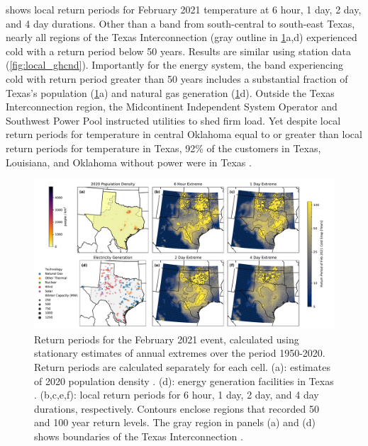 \documentclass[12pt]{iopart}
\begin{document}
 shows local return periods for February 2021 temperature at 6 hour, 1 day, 2 day, and 4 day durations.
Other than a band from south-central to south-east Texas, nearly all regions of the Texas Interconnection (gray outline in \cref{fig:local_era5}a,d) experienced cold with a return period below 50 years.
Results are similar using station data (\cref{fig:local_ghcnd}).
Importantly for the energy system, the band experiencing cold with return period greater than 50 years includes a substantial fraction of Texas’s population (\cref{fig:local_era5}a) and natural gas generation (\cref{fig:local_era5}d).
Outside the Texas Interconnection region, the Midcontinent Independent System Operator and Southwest Power Pool instructed utilities to shed firm load.
Yet despite local return periods for temperature in central Oklahoma equal to or greater than local return periods for temperature in Texas, 92\% of the customers in Texas, Louisiana, and Oklahoma without power were in Texas \cite{ceser_winterupdate:2021}.

\begin{figure}
  \centering
  \includegraphics[width=\textwidth]{local_rt_era5.pdf}
  \caption{
    Return periods for the February 2021 event, calculated using stationary estimates of annual extremes over the period 1950-2020.
    Return periods are calculated separately for each cell.
    (a): estimates of 2020 population density \cite{ciesin_gpwv4:2016}.
    (d): energy generation facilities in Texas \cite{useia_generators:2021}.
    (b,c,e,f): local return periods for 6 hour, 1 day, 2 day, and 4 day durations, respectively.
    Contours enclose regions that recorded 50 and 100 year return levels.
    The gray region in panels (a) and (d) shows boundaries of the Texas Interconnection \cite{useia_regions:2021}.
  }\label{fig:local_era5}
\end{figure}
\end{document}
